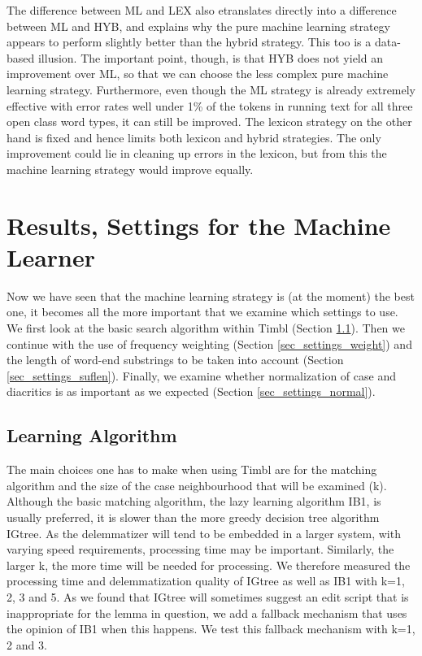 \documentclass[a4paper,10pt,twoside]{article}
\begin{document}
The difference between ML and LEX also etranslates directly into a difference between ML and HYB, and explains why the pure machine learning strategy appears to perform slightly better than the hybrid strategy. This too is a data-based illusion. The important point, though, is that HYB does not yield an improvement over ML, so that we can choose the less complex pure machine learning strategy. Furthermore, even though the ML strategy is already extremely effective with error rates well under 1\% of the tokens in running text for all three open class word types, it can still be improved. The lexicon strategy on the other hand is fixed and hence limits both lexicon and hybrid strategies. The only improvement could lie in cleaning up errors in the lexicon, but from this the machine learning strategy would improve equally.



\section{Results, Settings for the Machine Learner}
\label{sec_results_mlsettings}
Now we have seen that the machine learning strategy is (at the moment) the best one, it becomes all the more important that we examine which settings to use. We first look at the basic search algorithm within Timbl (Section \ref{sec_settings_alg}). Then we continue with the use of frequency weighting (Section \ref{sec_settings_weight}) and the length of word-end substrings to be taken into account (Section \ref{sec_settings_suflen}). Finally, we examine whether normalization of case and diacritics is as important as we expected (Section \ref{sec_settings_normal}).

\subsection{Learning Algorithm}
\label{sec_settings_alg}
The main choices one has to make when using Timbl are for the matching algorithm and the size of the case neighbourhood that will be examined (k). Although the basic matching algorithm, the lazy learning algorithm IB1, is usually preferred, it is slower than the more greedy decision tree algorithm IGtree. As the delemmatizer will tend to be embedded in a larger system, with varying speed requirements, processing time may be important. Similarly, the larger k, the more time will be needed for processing. We therefore measured the processing time and delemmatization quality of IGtree as well as IB1 with k=1, 2, 3 and 5. As we found that IGtree will sometimes suggest an edit script that is inappropriate for the lemma in question, we add a fallback mechanism that uses the opinion of IB1 when this happens. We test this fallback mechanism with k=1, 2 and 3.
\end{document}
